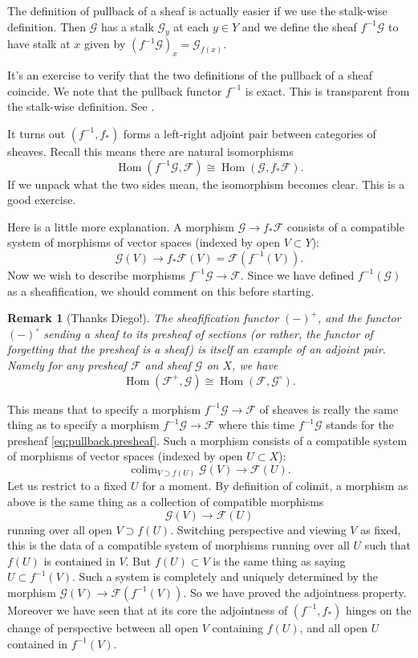 \documentclass[12pt]{article}
\theoremstyle{plain}
\newtheorem{rem}[thm]{Remark}
\newtheorem{exer}[thm]{Exercise}
\theoremstyle{definition}
\numberwithin{equation}{section}
\DeclareMathOperator*{\colim}{colim}
\DeclareMathOperator{\Hom}{Hom}
\newcommand{\CF}{\mathcal{F}}
\newcommand{\CG}{\mathcal{G}}
\begin{document}
The definition of pullback of a sheaf is actually easier if we use the stalk-wise definition. Then $\CG$ has a stalk $\CG_y$ at each $y \in Y$ and we define the sheaf $f^{-1}\CG$ to have stalk at $x$ given by $(f^{-1}\CG)_{x} = \CG_{f(x)}$.

It's an exercise to verify that the two definitions of the pullback of a sheaf coincide. We note that the pullback functor $f^{-1}$ is exact. This is transparent from the stalk-wise definition. See {\cite[Lemma 17.3.3(c)]{stacks-project}}.


It turns out $(f^{-1}, f_*)$ forms a left-right adjoint pair between categories of sheaves. Recall this means there are natural isomorphisms
\[
\Hom(f^{-1}\CG, \CF) \cong \Hom(\CG, f_*\CF).
\]
If we unpack what the two sides mean, the isomorphism becomes clear. This is a good exercise.
%

Here is a little more explanation. A morphism $\CG \rightarrow f_* \CF$ consists of a compatible system of morphisms of vector spaces (indexed by open $V \subset Y$):
\[
\CG(V) \rightarrow f_*\CF(V) = \CF(f^{-1}(V)).
\]
Now we wish to describe morphisms $f^{-1}\CG \rightarrow \CF$. Since we have defined $f^{-1}(\CG)$ as a sheafification, we should comment on this before starting.
\begin{rem}[Thanks Diego!]
The sheafification functor $(-)^+$, and the functor $(-)^{\circ}$ sending a sheaf to its presheaf of sections (or rather, the functor of forgetting that the presheaf is a sheaf) is itself an example of an adjoint pair. Namely for any presheaf $\CF$ and sheaf $\CG$ on $X$, we have
\[
\Hom(\CF^+, \CG) \cong \Hom(\CF, \CG^{\circ}).
\]
\end{rem}
This means that to specify a morphism $f^{-1}\CG \rightarrow \CF$ of sheaves is really the same thing as to specify a morphism $f^{-1}\CG \rightarrow \CF$ where this time $f^{-1}\CG$ stands for the presheaf \eqref{eq:pullback.presheaf}. Such a morphism consists of a compatible system of morphisms of vector spaces (indexed by open $U \subset X$):
\[
\colim_{V \supset f(U)} \CG(V) \rightarrow \CF(U).
\]
Let us restrict to a fixed $U$ for a moment. By definition of colimit, a morphism as above is the same thing as a collection of compatible morphisms
\[
\CG(V) \rightarrow \CF(U)
\]
running over all open $V \supset f(U)$. Switching perspective and viewing $V$ as fixed, this is the data of a compatible system of morphisms running over all $U$ such that $f(U)$ is contained in $V$. But $f(U) \subset V$ is the same thing as saying $U \subset f^{-1}(V)$. Such a system is completely and uniquely determined by the morphism $\CG(V) \rightarrow \CF(f^{-1}(V))$. So we have proved the adjointness property. Moreover we have seen that at its core the adjointness of $(f^{-1}, f_*)$ hinges on the change of perspective between all open $V$ containing $f(U)$, and all open $U$ contained in $f^{-1}(V)$.
\end{document}
